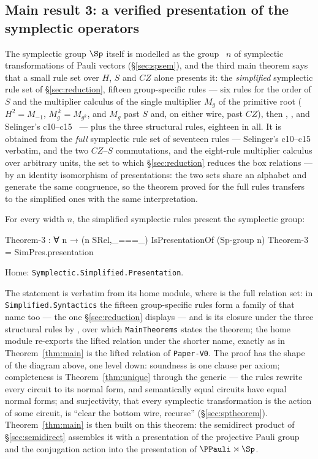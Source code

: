 \subsection{Main result 3: a verified presentation of the symplectic operators}\label{sec:main3}

The symplectic group $\Sp$ itself is modelled as the group
~$n$ of symplectic transformations of Pauli vectors
(\S\ref{sec:spsem}), and the third main theorem says that a small rule
set over $H$, $S$ and $CZ$ alone presents it: the \emph{simplified}
symplectic rule set of \S\ref{sec:reduction}, fifteen group-specific
rules --- six rules for the order of $S$ and the multiplier calculus of
the single multiplier $M_g$ of the primitive root ($H^{2} = M_{-1}$,
$M_g^{\,k} = M_{g^k}$, and $M_g$ past $S$ and, on either wire, past
$CZ$), then , ,  and
Selinger's c10--c15~\cite{selinger2015clifford} --- plus the three
structural rules, eighteen in all.  It is obtained from the \emph{full}
symplectic rule set of seventeen rules --- Selinger's c10--c15
verbatim,  and the two $CZ$--$S$ commutations, and the
eight-rule multiplier calculus over arbitrary units, the set to which
\S\ref{sec:reduction} reduces the box relations --- by an identity
isomorphism of presentations: the two sets share an
alphabet and generate the same congruence, so the theorem proved for
the full rules transfers to the simplified ones with the same
interpretation.

\begin{theorem}\label{thm:sp}
For every width $n$, the simplified symplectic rules present the
symplectic group:
\begin{code}
Theorem-3 : ∀ {n} → (n SRel,_===_) IsPresentationOf (Sp-group n)
Theorem-3 = SimPres.presentation
\end{code}
\noindent Home: \texttt{Symplectic.Simplified.Presentation}.
\end{theorem}

The statement is verbatim from its home module, where
 is the full relation set: in
\texttt{Simplified.Syntactics} the fifteen group-specific rules form a
family of that name too --- the one \S\ref{sec:reduction} displays ---
and  is its closure under the three
structural rules by , over which
\texttt{MainTheorems} states the theorem; the home module re-exports
the lifted relation under the shorter name, exactly as
 in Theorem~\ref{thm:main} is the lifted
relation of \texttt{Paper-V0}.  The proof has the shape
of the diagram above, one level down: soundness is one clause per
axiom; completeness is Theorem~\ref{thm:unique} through the generic
 --- the rules rewrite every circuit to its
normal form, and semantically equal circuits have equal normal forms;
and surjectivity, that every symplectic transformation is the action of
some circuit, is ``clear the bottom wire, recurse''
(\S\ref{sec:sptheorem}).  Theorem~\ref{thm:main} is then built on this
theorem: the semidirect product of \S\ref{sec:semidirect} assembles it
with a presentation of the projective Pauli group and the conjugation
action into the presentation of $\PPauli \rtimes \Sp$.
